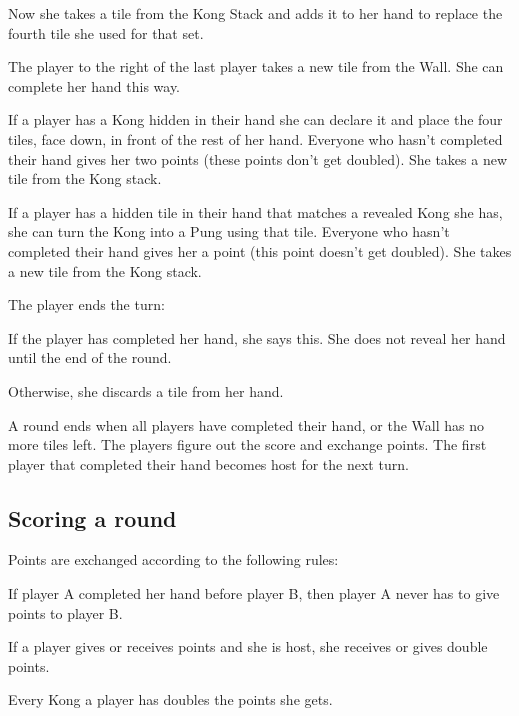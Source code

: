 \documentclass{article}
\begin{document}
\begin{enumerate*}
\begin{enumerate*}
        Now she takes a tile from the Kong Stack and adds it to her hand to replace the fourth tile she used for that set.
        \item The player to the right of the last player takes a new tile from the Wall. She can complete her hand this way.
    \end{enumerate*}
    \item If a player has a Kong hidden in their hand she can declare it and place the four tiles, face down, in front of the rest of her hand.
    Everyone who hasn't completed their hand gives her two points (these points don't get doubled).
    She takes a new tile from the Kong stack.
    \item If a player has a hidden tile in their hand that matches a revealed Kong she has, she can turn the Kong into a Pung using that tile.
    Everyone who hasn't completed their hand gives her a point (this point doesn't get doubled).
    She takes a new tile from the Kong stack.
    \item The player ends the turn:
        \begin{enumerate*}
            \item If the player has completed her hand, she says this. She does not reveal her hand until the end of the round.
            \item Otherwise, she discards a tile from her hand.
        \end{enumerate*}
\end{enumerate*}

A round ends when all players have completed their hand, or the Wall has no more tiles left. The players figure out the score and exchange points. The first player that completed their hand becomes host for the next turn.

\subsection{Scoring a round}
Points are exchanged according to the following rules:
\begin{itemize*}
    \item If player A completed her hand before player B, then player A never has to give points to player B.
    \item If a player gives or receives points and she is host, she receives or gives double points.
    \item Every Kong a player has doubles the points she gets.

\end{itemize*}
\end{document}
